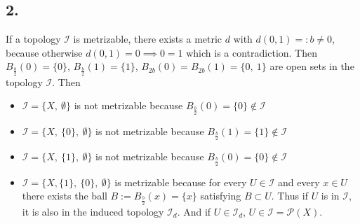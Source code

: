 \documentclass{article}
\begin{document}
\subsection*{2.}
If a topology $\mathcal{I}$ is metrizable, there exists a metric $d$ with $d(0,1) =: b \neq 0$, because otherwise $d(0, 1) = 0 \implies 0 = 1$ which is a contradiction.
Then $B_{\frac{b}{2}}(0) = \{0\}$, $B_{\frac{b}{2}}(1) = \{1\}$, $B_{2b}(0) = B_{2b}(1) = \{0 ,\ 1\}$ are open sets in the topology $\mathcal{I}$.
Then
\begin{itemize}
\item $\mathcal{I} = \{X ,\ \emptyset \}$ is not metrizable because $B_{\frac{b}{2}}(0) = \{0\} \notin \mathcal{I}$
\item $\mathcal{I} = \{X ,\ \{0\} ,\ \emptyset \}$ is not metrizable because $B_{\frac{b}{2}}(1) = \{1\} \notin \mathcal{I}$
\item $\mathcal{I} = \{X ,\ \{1\} ,\ \emptyset \}$ is not metrizable because $B_{\frac{b}{2}}(0) = \{0\} \notin \mathcal{I}$
\item $\mathcal{I} = \{X , \{1\} ,\ \{0\} ,\ \emptyset \}$ is metrizable because for every $U \in \mathcal{I}$ and every $x \in U$ there exists the ball $B := B_{\frac{b}{2}}(x) = \{x\}$ satisfying $B \subset U$. Thus if $U$ is in $\mathcal{I}$, it is also in the induced topology $\mathcal{I}_{d}$.
    And if $U \in \mathcal{I}_{d}$, $U \in \mathcal{I} = \mathcal{P}(X)$.
\end{itemize}
\end{document}
